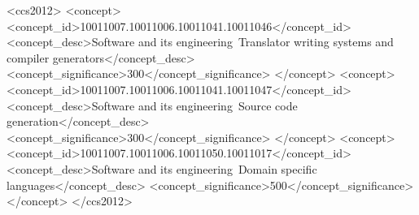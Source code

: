\documentclass[sigplan,anonymous,review]{acmart}
\begin{document}
\begin{CCSXML}
<ccs2012>
   <concept>
       <concept_id>10011007.10011006.10011041.10011046</concept_id>
       <concept_desc>Software and its engineering~Translator writing systems and compiler generators</concept_desc>
       <concept_significance>300</concept_significance>
       </concept>
   <concept>
       <concept_id>10011007.10011006.10011041.10011047</concept_id>
       <concept_desc>Software and its engineering~Source code generation</concept_desc>
       <concept_significance>300</concept_significance>
       </concept>
   <concept>
       <concept_id>10011007.10011006.10011050.10011017</concept_id>
       <concept_desc>Software and its engineering~Domain specific languages</concept_desc>
       <concept_significance>500</concept_significance>
       </concept>
 </ccs2012>
\end{CCSXML}






\end{document}
